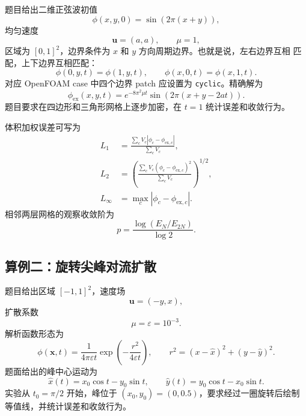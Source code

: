\documentclass[UTF8,12pt,a4paper]{ctexart}
\numberwithin{equation}{section}
\newcommand{\xf}{\bm x}
\newcommand{\uf}{\bm u}
\begin{document}
题目给出二维正弦波初值
\begin{equation}
  \phi(x,y,0)=\sin(2\pi(x+y)),
  \label{eq:sine_initial}
\end{equation}
均匀速度
\begin{equation}
  \uf=(a,a),
  \qquad
  \mu=1,
\end{equation}
区域为 $[0,1]^2$，边界条件为 $x$ 和 $y$ 方向周期边界。也就是说，左右边界互相
匹配，上下边界互相匹配：
\begin{equation}
  \phi(0,y,t)=\phi(1,y,t),
  \qquad
  \phi(x,0,t)=\phi(x,1,t).
  \label{eq:sine_periodic_bc}
\end{equation}
对应 OpenFOAM case 中四个边界 patch 应设置为 \texttt{cyclic}。精确解为
\begin{equation}
  \phi_{\mathrm{ex}}(x,y,t)
  =
  e^{-8\pi^2\mu t}
  \sin(2\pi(x+y-2at)).
  \label{eq:sine_exact}
\end{equation}
题目要求在四边形和三角形网格上逐步加密，在 $t=1$ 统计误差和收敛行为。

体积加权误差可写为
\begin{align}
  L_1
  &=
  \frac{\sum_c V_c|\phi_c-\phi_{\mathrm{ex},c}|}{\sum_c V_c},
  \\
  L_2
  &=
  \left(
  \frac{\sum_c V_c(\phi_c-\phi_{\mathrm{ex},c})^2}{\sum_c V_c}
  \right)^{1/2},
  \\
  L_\infty
  &=
  \max_c|\phi_c-\phi_{\mathrm{ex},c}|.
\end{align}
相邻两层网格的观察收敛阶为
\begin{equation}
  p=\frac{\log(E_N/E_{2N})}{\log 2}.
  \label{eq:order}
\end{equation}

\subsection{算例二：旋转尖峰对流扩散}

题目给出区域 $[-1,1]^2$，速度场
\begin{equation}
  \uf=(-y,x),
  \label{eq:rotation_velocity}
\end{equation}
扩散系数
\begin{equation}
  \mu=\varepsilon=10^{-3}.
\end{equation}
解析函数形态为
\begin{equation}
  \phi(\xf,t)
  =
  \frac{1}{4\pi\varepsilon t}
  \exp\left(-\frac{r^2}{4\varepsilon t}\right),
  \qquad
  r^2=(x-\widehat x)^2+(y-\widehat y)^2.
  \label{eq:sharp_peak}
\end{equation}
题面给出的峰中心运动为
\begin{equation}
  \widehat x(t)=x_0\cos t-y_0\sin t,
  \qquad
  \widehat y(t)=y_0\cos t-x_0\sin t.
  \label{eq:peak_center_problem}
\end{equation}
实验从 $t_0=\pi/2$ 开始，峰位于 $(x_0,y_0)=(0,0.5)$，要求经过一圈旋转后绘制
等值线，并统计误差和收敛行为。
\end{document}
